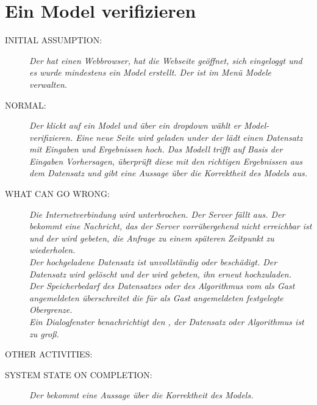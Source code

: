 \section{Ein Model verifizieren}
\begin{description}
  \item [INITIAL ASSUMPTION:]
    \textit{Der  hat einen Webbrowser, hat die Webseite geöffnet, sich eingeloggt und es wurde mindestens ein \gls{Model} erstellt. Der  ist im Menü \gls{Model}e verwalten.}
  \item [NORMAL:]
    \textit{Der  klickt auf ein \gls{Model} und über ein \gls{dropdown} wählt er \gls{Model}-verifizieren. Eine neue Seite wird geladen under der  lädt einen \gls{Datensatz} mit Eingaben und Ergebnissen hoch. Das Modell trifft auf Basis der Eingaben Vorhersagen, überprüft diese mit den richtigen Ergebnissen aus dem Datensatz und gibt eine Aussage über die Korrektheit des \gls{Model}s aus.
}
  \item [WHAT CAN GO WRONG:]
    \textit{Die Internetverbindung wird unterbrochen.
Der Server fällt aus. Der  bekommt eine Nachricht, das der Server vorrübergehend nicht erreichbar ist und der  wird gebeten, die Anfrage zu einem späteren Zeitpunkt zu wiederholen.\\
Der hochgeladene \gls{Datensatz} ist unvollständig oder beschädigt. Der \gls{Datensatz} wird gelöscht und der  wird gebeten, ihn erneut hochzuladen.\\
Der Speicherbedarf des \gls{Datensatz}es oder des Algorithmus vom als \gls{Gast} angemeldeten  überschreitet die für als \gls{Gast} angemeldeten  festgelegte Obergrenze.\\ Ein Dialogfenster benachrichtigt den , der \gls{Datensatz} oder Algorithmus ist zu groß.}
  \item [OTHER ACTIVITIES:]
    \textit{}
  \item [SYSTEM STATE ON COMPLETION:]
    \textit{Der  bekommt eine Aussage über die Korrektheit des \gls{Model}s.}
\end{description}

